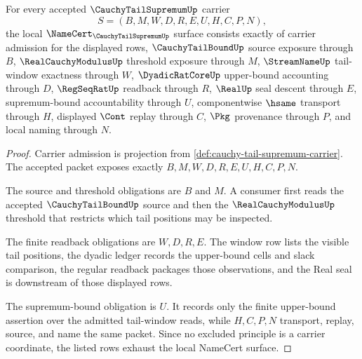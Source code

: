 \begin{theorem}
\label{thm:cauchy-tail-supremum-namecert-obligations}
For every accepted $\CauchyTailSupremumUp$ carrier
$$
S=(B,M,W,D,R,E,U,H,C,P,N),
$$
the local $\NameCert_{\CauchyTailSupremumUp}$ surface consists exactly of carrier admission for the displayed rows, $\CauchyTailBoundUp$ source exposure through $B$, $\RealCauchyModulusUp$ threshold exposure through $M$, $\StreamNameUp$ tail-window exactness through $W$, $\DyadicRatCoreUp$ upper-bound accounting through $D$, $\RegSeqRatUp$ readback through $R$, $\RealUp$ seal descent through $E$, supremum-bound accountability through $U$, componentwise $\hsame$ transport through $H$, displayed $\Cont$ replay through $C$, $\Pkg$ provenance through $P$, and local naming through $N$.
\end{theorem}
\begin{proof}
Carrier admission is projection from \autoref{def:cauchy-tail-supremum-carrier}. The accepted packet exposes exactly $B,M,W,D,R,E,U,H,C,P,N$.

The source and threshold obligations are $B$ and $M$. A consumer first reads the accepted $\CauchyTailBoundUp$ source and then the $\RealCauchyModulusUp$ threshold that restricts which tail positions may be inspected.

The finite readback obligations are $W,D,R,E$. The window row lists the visible tail positions, the dyadic ledger records the upper-bound cells and slack comparison, the regular readback packages those observations, and the Real seal is downstream of those displayed rows.

The supremum-bound obligation is $U$. It records only the finite upper-bound assertion over the admitted tail-window reads, while $H,C,P,N$ transport, replay, source, and name the same packet. Since no excluded principle is a carrier coordinate, the listed rows exhaust the local NameCert surface.
\end{proof}

